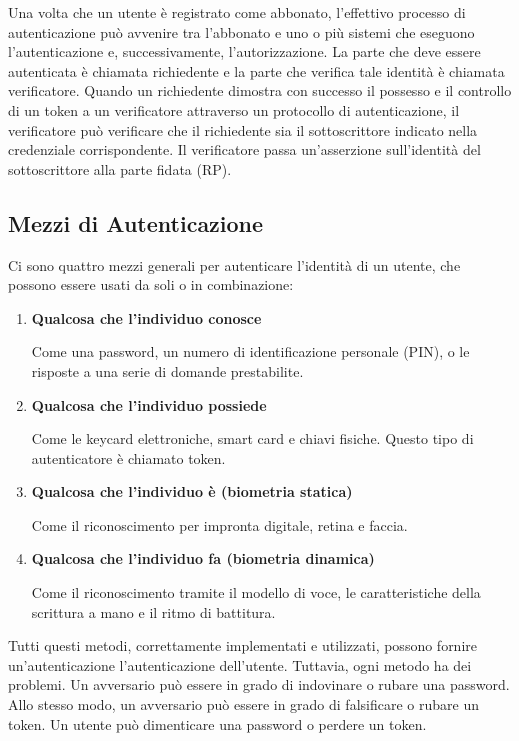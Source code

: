 Una volta che un utente è registrato come abbonato, l'effettivo processo di autenticazione può avvenire tra l'abbonato e uno o più sistemi che eseguono l'autenticazione e, successivamente, l'autorizzazione. La parte che deve essere autenticata è chiamata richiedente e la parte che verifica tale identità è chiamata verificatore. Quando un richiedente dimostra con successo il possesso e il controllo di un token a un verificatore attraverso un protocollo di autenticazione, il verificatore può verificare che il richiedente sia il sottoscrittore indicato nella credenziale corrispondente. Il verificatore passa un'asserzione sull'identità del sottoscrittore alla parte fidata (RP).

\newpage
\subsection{Mezzi di Autenticazione}
Ci sono quattro mezzi generali per autenticare l'identità di un utente, che possono essere usati da soli o in combinazione:
\begin{enumerate}
    \item \textbf{Qualcosa che l'individuo conosce}
    
    Come una password, un numero di identificazione personale (PIN), o le risposte a una serie di domande prestabilite.
    
    \item \textbf{Qualcosa che l'individuo possiede}
    
    Come le keycard elettroniche, smart card e chiavi fisiche. Questo tipo di autenticatore è chiamato token.
    
    \item \textbf{Qualcosa che l'individuo è (biometria statica)}
    
    Come il riconoscimento per impronta digitale, retina e faccia.
    
    \item \textbf{Qualcosa che l'individuo fa (biometria dinamica)}
    
    Come il riconoscimento tramite il modello di voce, le caratteristiche della scrittura a mano e il ritmo di battitura.
\end{enumerate}
Tutti questi metodi, correttamente implementati e utilizzati, possono fornire un'autenticazione l'autenticazione dell'utente. Tuttavia, ogni metodo ha dei problemi. Un avversario può essere in grado di indovinare o rubare una password. Allo stesso modo, un avversario può essere in grado di falsificare o rubare un token. Un utente può dimenticare una password o perdere un token. 
